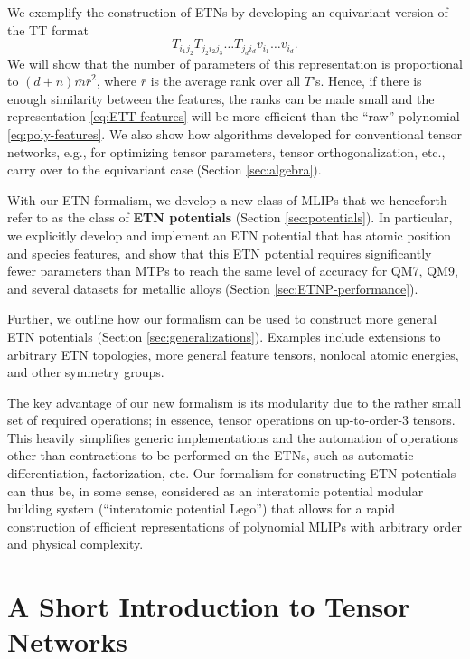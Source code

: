 We exemplify the construction of ETNs by developing an equivariant version of the TT format
\begin{equation}\label{eq:ETT-features}
    T_{i_1j_2} T_{j_2i_2j_3} \ldots T_{j_di_d} v_{i_1} \ldots v_{i_d}.
\end{equation}
We will show that the number of parameters of this representation is proportional to $(d + n)\bar{m}\bar{r}^2$, where $\bar{r}$ is the average rank over all $T$'s.
Hence, if there is enough similarity between the features, the ranks can be made small and the representation \eqref{eq:ETT-features} will be more efficient than the ``raw'' polynomial \eqref{eq:poly-features}.
We also show how algorithms developed for conventional tensor networks, e.g., for optimizing tensor parameters, tensor orthogonalization, etc., carry over to the equivariant case (Section \ref{sec:algebra}).

With our ETN formalism, we develop a new class of MLIPs that we henceforth refer to as the class of \textbf{ETN potentials} (Section \ref{sec:potentials}).
In particular, we explicitly develop and implement an ETN potential that has atomic position and species features, and show that this ETN potential requires significantly fewer parameters than MTPs to reach the same level of accuracy for QM7, QM9, and several datasets for metallic alloys (Section \ref{sec:ETNP-performance}).

Further, we outline how our formalism can be used to construct more general ETN potentials (Section \ref{sec:generalizations}).
Examples include extensions to arbitrary ETN topologies, more general feature tensors, nonlocal atomic energies, and other symmetry groups.

The key advantage of our new formalism is its modularity due to the rather small set of required operations; in essence, tensor operations on up-to-order-3 tensors.
This heavily simplifies generic implementations and the automation of operations other than contractions to be performed on the ETNs, such as automatic differentiation, factorization, etc.
Our formalism for constructing ETN potentials can thus be, in some sense, considered as an interatomic potential modular building system (``interatomic potential Lego'') that allows for a rapid construction of efficient representations of polynomial MLIPs with arbitrary order and physical complexity.

\section{A Short Introduction to Tensor Networks}
\label{sec:tn-intro}

